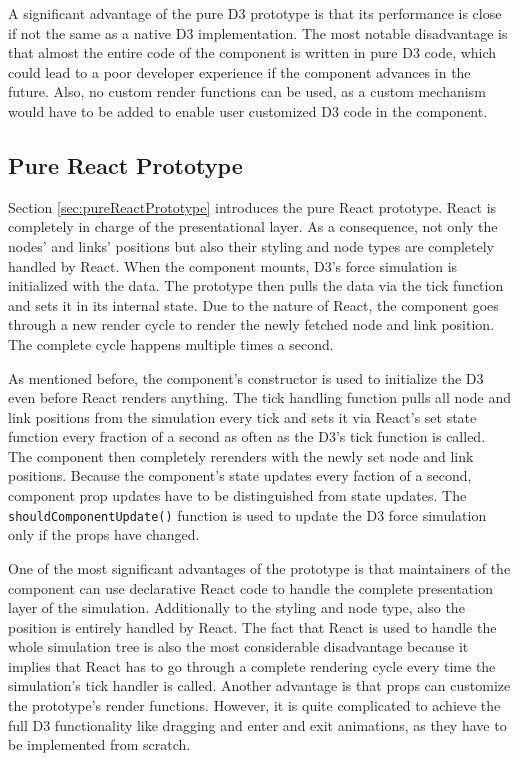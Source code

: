 A significant advantage of the pure D3 prototype is that its performance is close if not the same as a native D3 implementation. The most notable disadvantage is that almost the entire code of the component is written in pure D3 code, which could lead to a poor developer experience if the component advances in the future. Also, no custom render functions can be used, as a custom mechanism would have to be added to enable user customized D3 code in the component. 

\subsection{Pure React Prototype}

Section \ref{sec:pureReactPrototype} introduces the pure React prototype. React is completely in charge of the presentational layer. As a consequence, not only the nodes' and links' positions but also their styling and node types are completely handled by React. When the component mounts, D3's force simulation is initialized with the data. The prototype then pulls the data via the tick function and sets it in its internal state. Due to the nature of React, the component goes through a new render cycle to render the newly fetched node and link position. The complete cycle happens multiple times a second.

As mentioned before, the component's constructor is used to initialize the D3 even before React renders anything. The tick handling function pulls all node and link positions from the simulation every tick and sets it via React's set state function every fraction of a second as often as the D3's tick function is called. The component then completely rerenders with the newly set node and link positions. Because the component's state updates every faction of a second, component prop updates have to be distinguished from state updates. The \texttt{shouldComponentUpdate()} function is used to update the D3 force simulation only if the props have changed.

One of the most significant advantages of the prototype is that maintainers of the component can use declarative React code to handle the complete presentation layer of the simulation. Additionally to the styling and node type, also the position is entirely handled by React. The fact that React is used to handle the whole simulation tree is also the most considerable disadvantage because it implies that React has to go through a complete rendering cycle every time the simulation's tick handler is called. Another advantage is that props can customize the prototype's render functions. However, it is quite complicated to achieve the full D3 functionality like dragging and enter and exit animations, as they have to be implemented from scratch. 

